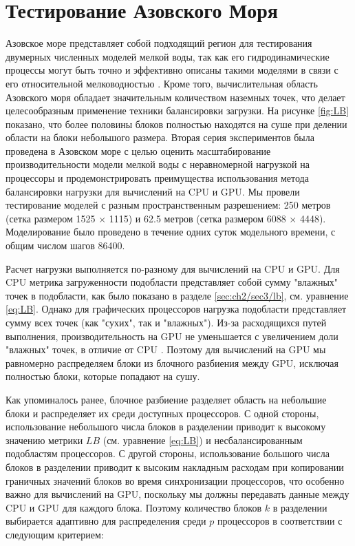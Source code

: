\section{Тестирование Азовского Моря}\label{sec:ch3/sec2}

Азовское море представляет собой подходящий регион для тестирования двумерных численных моделей мелкой воды, так как его гидродинамические процессы могут быть точно и эффективно описаны такими моделями в связи с его относительной мелководностью \cite{Azov}.
Кроме того, вычислительная область Азовского моря обладает значительным количеством наземных точек, что делает целесообразным применение техники балансировки загрузки.
На рисунке \ref{fig:LB} показано, что более половины блоков полностью находятся на суше при делении области на блоки небольшого размера.
Вторая серия экспериментов была проведена в Азовском море с целью оценить масштабирование производительности модели мелкой воды с неравномерной нагрузкой на процессоры и продемонстрировать преимущества использования метода балансировки нагрузки для вычислений на CPU и GPU.
Мы провели тестирование моделей с разным пространственным разрешением: 250 метров (сетка размером 1525 $\times$ 1115) и 62.5 метров (сетка размером 6088 $\times$ 4448). Моделирование было проведено в течение одних суток модельного времени, с общим числом шагов 86400.  


Расчет нагрузки выполняется по-разному для вычислений на CPU и GPU.
Для CPU метрика загруженности подобласти представляет собой сумму "влажных" точек в подобласти, как было показано в разделе \ref{sec:ch2/sec3/lb}, см. уравнение \ref{eq:LB}.
Однако для графических процессоров нагрузка подобласти представляет сумму всех точек (как "сухих", так и "влажных").
Из-за расходящихся путей выполнения, производительность на GPU не уменьшается с увеличением доли "влажных" точек, в отличие от CPU \cite{kirk10}.
Поэтому для вычислений на GPU мы равномерно распределяем блоки из блочного разбиения между GPU, исключая полностью блоки, которые попадают на сушу.

Как упоминалось ранее, блочное разбиение разделяет область на небольшие блоки и распределяет их среди доступных процессоров.
С одной стороны, использование небольшого числа блоков в разделении приводит к высокому значению метрики $LB$ (см. уравнение \ref{eq:LB}) и несбалансированным подобластям процессоров.
С другой стороны, использование большого числа блоков в разделении приводит к высоким накладным расходам при копировании граничных значений блоков во время синхронизации процессоров, что особенно важно для вычислений на GPU, поскольку мы должны передавать данные между CPU и GPU для каждого блока.
Поэтому количество блоков $k$ в разделении выбирается адаптивно для распределения среди $p$ процессоров в соответствии с следующим критерием:

